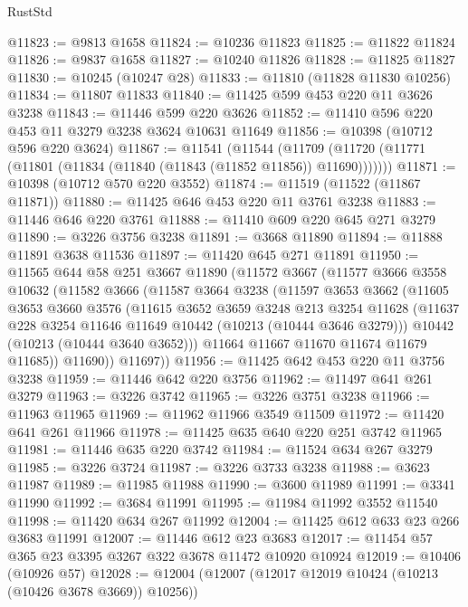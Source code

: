 \begin{lexlean}{RustStd}
\begin{coremodule}
{\begin{coremodule}
{{{{{{{{{{{{{{{{{{{{{{{{{{@11823 := @9813 @1658
@11824 := @10236 @11823
@11825 := @11822 @11824
@11826 := @9837 @1658
@11827 := @10240 @11826
@11828 := @11825 @11827
@11830 := @10245 (@10247 @28)
@11833 := @11810 (@11828 @11830 @10256)
@11834 := @11807 @11833
@11840 := @11425 @599 @453 @220 @11 @3626 @3238
@11843 := @11446 @599 @220 @3626
@11852 := @11410 @596 @220 @453 @11 @3279 @3238 @3624 @10631 @11649
@11856 := @10398 (@10712 @596 @220 @3624)
@11867 := @11541
    (@11544 (@11709 (@11720 (@11771 (@11801 (@11834 (@11840 (@11843 (@11852 @11856)) @11690)))))))
@11871 := @10398 (@10712 @570 @220 @3552)
@11874 := @11519 (@11522 (@11867 @11871))
@11880 := @11425 @646 @453 @220 @11 @3761 @3238
@11883 := @11446 @646 @220 @3761
@11888 := @11410 @609 @220 @645 @271 @3279
@11890 := @3226 @3756 @3238
@11891 := @3668 @11890
@11894 := @11888 @11891 @3638 @11536
@11897 := @11420 @645 @271 @11891
@11950 := @11565
    @644
    @58
    @251
    @3667
    @11890
    (@11572
      @3667
      (@11577
        @3666
        @3558
        @10632
        (@11582
          @3666
          (@11587
            @3664
            @3238
            (@11597
              @3653
              @3662
              (@11605
                @3653
                @3660
                @3576
                (@11615
                  @3652
                  @3659
                  @3248
                  @213
                  @3254
                  @11628
                  (@11637 @228 @3254 @11646 @11649 @10442 (@10213 (@10444 @3646 @3279)))
                  @10442
                  (@10213 (@10444 @3640 @3652)))
                @11664
                @11667
                @11670
                @11674
                @11679
                @11685))
            @11690))
        @11697))
@11956 := @11425 @642 @453 @220 @11 @3756 @3238
@11959 := @11446 @642 @220 @3756
@11962 := @11497 @641 @261 @3279
@11963 := @3226 @3742
@11965 := @3226 @3751 @3238
@11966 := @11963 @11965
@11969 := @11962 @11966 @3549 @11509
@11972 := @11420 @641 @261 @11966
@11978 := @11425 @635 @640 @220 @251 @3742 @11965
@11981 := @11446 @635 @220 @3742
@11984 := @11524 @634 @267 @3279
@11985 := @3226 @3724
@11987 := @3226 @3733 @3238
@11988 := @3623 @11987
@11989 := @11985 @11988
@11990 := @3600 @11989
@11991 := @3341 @11990
@11992 := @3684 @11991
@11995 := @11984 @11992 @3552 @11540
@11998 := @11420 @634 @267 @11992
@12004 := @11425 @612 @633 @23 @266 @3683 @11991
@12007 := @11446 @612 @23 @3683
@12017 := @11454 @57 @365 @23 @3395 @3267 @322 @3678 @11472 @10920 @10924
@12019 := @10406 (@10926 @57)
@12028 := @12004 (@12007 (@12017 @12019 @10424 (@10213 (@10426 @3678 @3669)) @10256))
}}}}}}}}}}}}}}}}}}}}}}}}}}
\end{coremodule}}
\end{coremodule}
\end{lexlean}
